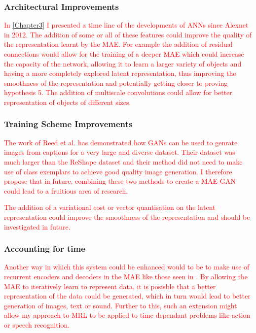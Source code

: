 \subsubsection{Architectural Improvements}
\textcolor{red}{In \autoref{Chapter3} I presented a time line of the developments of \acp{ANN} since Alexnet \cite{krizhevsky2012imagenet} in 2012. The addition of some or all of these features could improve the quality of the representation learnt by the \ac{MAE}. For example the addition of residual connections \cite{he2016deep} would allow for the training of a deeper \ac{MAE} which could increase the capacity of the network, allowing it to learn a larger variety of objects and having a more completely explored latent representation, thus improving the smoothness of the representation and potentially getting closer to proving hypothesis 5. The addition of multiscale convolutions \cite{szegedy2015going} could allow for better representation of objects of different sizes.}

\subsubsection{Training Scheme Improvements}
\textcolor{red}{The work of Reed et al. \cite{reed2016generative} has demonstrated how \acp{GAN} can be used to genrate images from captions for a very large and diverse dataset. Their dataset was much larger than the ReShape dataset and their method did not need to make use of class exemplars to achieve good quality image generation. I therefore propose that in future, combining these two methods to create a \ac{MAE} \ac{GAN} could lead to a fruitious area of research.}

\textcolor{red}{The addition of a variational cost \cite{kingma2013auto} or vector quantisation \cite{wavenet} on the latent representation could improve the smoothness of the representation and should be investigated in future.}


\subsubsection{Accounting for time}
\textcolor{red}{Another way in which this system could be enhanced would to be to make use of recurrent encoders and decoders in the \ac{MAE} like those seen in \cite{gregor2015draw}. By allowing the \ac{MAE} to iteratively learn to represent data, it is posisble that a better representation of the data could be generated, which in turn would lead to better generation of images, text or sound. Further to this, such an extension might allow my approach to \ac{MRL} to be applied to time dependant problems like action or speech recognition.}




